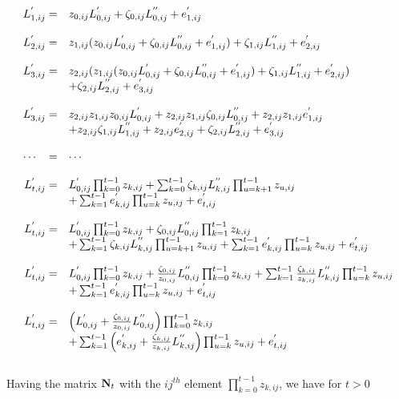 \documentclass[12pt]{article}
\begin{document}
\begin{bibunit}
\begin{equation}
\begin{array}{rl}
L^{'}_{{1},ij} =& z_{{0},ij}L^{'}_{{0},ij}+\zeta_{{0},ij}L^{''}_{{0},ij}+e^{'}_{{1},ij}\\
\\
L^{'}_{{2},ij} =& z_{{1},ij}(z_{{0},ij}L^{'}_{{0},ij}+\zeta_{{0},ij}L^{''}_{{0},ij}+e^{'}_{{1},ij})+\zeta_{{1},ij}L^{''}_{{1},ij}+e^{'}_{{2},ij}\\
\\
L^{'}_{{3},ij} =& 
z_{{2},ij}(z_{{1},ij}(z_{{0},ij}L^{'}_{{0},ij}+\zeta_{{0},ij}L^{''}_{{0},ij}+e^{'}_{{1},ij})+\zeta_{{1},ij}L^{''}_{{1},ij}+e^{'}_{{2},ij})\\
&+\zeta_{{2},ij}L^{''}_{{2},ij}+e^{'}_{{3},ij}\\
\\
L^{'}_{{3},ij} =&z_{{2},ij}z_{{1},ij}z_{{0},ij}L^{'}_{{0},ij}+z_{{2},ij}z_{{1},ij}\zeta_{{0},ij}L^{''}_{{0},ij}+z_{{2},ij}z_{{1},ij}e_{{1},ij}^{'}\\
&+z_{{2},ij}\zeta_{{1},ij}L^{''}_{{1},ij}+z_{{2},ij}e_{{2},ij}^{'}+\zeta_{{2},ij}L^{''}_{{2},ij}+e_{{3},ij}^{'}\\
\\
\cdots \hspace{0.3cm}= &\cdots\\
\\
L^{'}_{{t},ij} =&L^{'}_{{0},ij}\prod_{k=0}^{t-1}z_{{k},ij}+\sum_{k=0}^{t-1}\zeta_{{k},ij}L^{''}_{{k},ij}\prod_{u=k+1}^{t-1}z_{{u},ij}\\
&+\sum_{k=1}^{t-1}e^{'}_{{k},ij}\prod_{u=k}^{t-1}z_{{u},ij}+e^{'}_{{t},ij}\\

\\
L^{'}_{{t},ij} =&L^{'}_{{0},ij}\prod_{k=0}^{t-1}z_{{k},ij}+\zeta_{{0},ij}L^{''}_{{0},ij}\prod_{k=1}^{t-1}z_{{k},ij}\\
&+\sum_{k=1}^{t-1}\zeta_{{k},ij}L^{''}_{{k},ij}\prod_{u=k+1}^{t-1}z_{{u},ij}+\sum_{k=1}^{t-1}e^{'}_{{k},ij}\prod_{u=k}^{t-1}z_{{u},ij}+e^{'}_{{t},ij}\\
\\
L^{'}_{{t},ij} =&L^{'}_{{0},ij}\prod_{k=0}^{t-1}z_{{k},ij}+\frac{\zeta_{{0},ij}}{z_{{0},ij}}L^{''}_{{0},ij}\prod_{k=0}^{t-1}z_{{k},ij}+\sum_{k=1}^{t-1}\frac{\zeta_{{k},ij}}{z_{{k},ij}}L^{''}_{{k},ij}\prod_{u=k}^{t-1}z_{{u},ij}\\
&+\sum_{k=1}^{t-1}e^{'}_{{k},ij}\prod_{u=k}^{t-1}z_{{u},ij}+e^{'}_{{t},ij}\\
\\
L^{'}_{{t},ij} =&\left(L^{'}_{{0},ij}+\frac{\zeta_{{0},ij}}{z_{{0},ij}}L^{''}_{{0},ij}\right)\prod_{k=0}^{t-1}z_{{k},ij}\\
&+\sum_{k=1}^{t-1}\left(e^{'}_{{k},ij}+\frac{\zeta_{{k},ij}}{z_{{k},ij}}L^{''}_{{k},ij}\right) \prod_{u=k}^{t-1}z_{{u},ij}+e^{'}_{{t},ij}
\end{array}
\label{eq:LD1}
\end{equation}
\\
 Having the matrix ${\bf N}_t$ with the $ij^{th}$ element $\prod_{k=0}^{t-1}z_{k, ij}$, we have for $t>0$
 

\end{bibunit}
\end{document}

